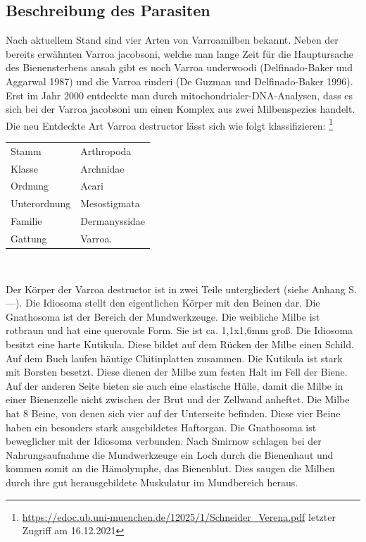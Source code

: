 \documentclass[11pt,a4paper]{article}
\begin{document}
\subsection{Beschreibung des Parasiten}
Nach aktuellem Stand sind vier Arten von Varroamilben bekannt. Neben der bereits erwähnten Varroa jacobsoni, welche man lange Zeit für die Hauptursache des Bienensterbens ansah gibt es noch Varroa underwoodi (Delfinado-Baker und Aggarwal 1987) und die Varroa rinderi (De Guzman und Delfinado-Baker 1996). Erst im Jahr 2000 entdeckte man durch mitochondrialer-DNA-Analysen, dass es sich bei der Varroa jacobsoni um einen Komplex aus zwei Milbenspezies handelt. Die neu Entdeckte Art Varroa destructor lässt sich wie folgt klassifizieren: \footnote{\url{https://edoc.ub.uni-muenchen.de/12025/1/Schneider_Verena.pdf} letzter Zugriff am 16.12.2021}\\
\begin{center}
\begin{tabular}{l|l}
     Stamm & Arthropoda \\
     Klasse & Archnidae  \\
     Ordnung & Acari \\
     Unterordnung & Mesostigmata \\
     Familie & Dermanyssidae \\
     Gattung & Varroa. \\
\end{tabular}\\
\end{center}
Der Körper der Varroa destructor ist in zwei Teile untergliedert (siehe Anhang S. ---). Die Idiosoma stellt den eigentlichen Körper mit den Beinen dar. Die Gnathosoma ist der Bereich der Mundwerkzeuge. 
Die weibliche Milbe ist rotbraun und hat eine querovale Form. Sie ist ca. 1,1x1,6mm groß. Die Idiosoma besitzt eine harte Kutikula. Diese bildet auf dem Rücken der Milbe einen Schild. Auf dem Buch laufen häutige Chitinplatten zusammen. Die Kutikula ist stark mit Borsten besetzt. Diese dienen der Milbe zum festen Halt im Fell der Biene. Auf der anderen Seite bieten sie auch eine elastische Hülle, damit die Milbe in einer Bienenzelle nicht zwischen der Brut und der Zellwand anheftet. Die Milbe hat 8 Beine, von denen sich vier auf der Unterseite befinden. Diese vier Beine haben ein besonders stark ausgebildetes Haftorgan. 
Die Gnathosoma ist beweglicher mit der Idiosoma verbunden. Nach Smirnow schlagen bei der Nahrungsaufnahme die Mundwerkzeuge ein Loch durch die Bienenhaut und kommen somit an die Hämolymphe, das Bienenblut. Dies saugen die Milben durch ihre gut herausgebildete Muskulatur im Mundbereich heraus. 
\end{document}
